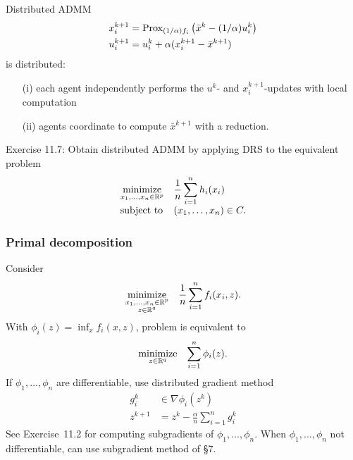 \documentclass[10pt,mathserif]{beamer}
\begin{document}
\begin{frame}
Distributed ADMM
\begin{align*}
x_i^{k+1}&=\mathrm{Prox}_{(1/\alpha)f_i}\left(\bar{x}^{k}-(1/\alpha)u^k_i\right)\\
u_i^{k+1}&=u^k_i+\alpha(x_i^{k+1}-\bar{x}^{k+1})
\end{align*}
 is distributed:
\begin{itemize}
\item[(i)] each agent independently performs the $u^k$- and $x_i^{k+1}$-updates with local computation
\item[(ii)] agents coordinate to compute $\bar{x}^{k+1}$ with a reduction.
\end{itemize}
\pause\medskip

Exercise 11.7: Obtain distributed ADMM by applying DRS to the equivalent problem
\vspace*{-10pt}
\[
\begin{array}{ll}
\underset{x_1,\dots,x_n \in\mathbb{R}^p}{\mbox{minimize}} &\displaystyle{\frac{1}{n}\sum_{i=1}^n h_i(x_i)}\\
\mbox{subject to}& (x_1,\dots,x_n)\in C.
\end{array}
\]
\end{frame}


\begin{frame}[plain]
\frametitle{Primal decomposition}
Consider 
\[
\begin{array}{ll}
\underset{\substack{x_1,\dots,x_n\in\mathbb{R}^p\\z\in \mathbb{R}^q}}{\mbox{minimize}} &\displaystyle{\frac{1}{n}\sum_{i=1}^n f_i(x_i,z)}.
\end{array}
\]
With $ \phi_i(z)=\inf_xf_i(x,z)$, problem is equivalent to
\[
\begin{array}{ll}
\underset{z\in \mathbb{R}^q}{\mbox{minimize}} &\displaystyle{\sum_{i=1}^n \phi_i(z)}.
\end{array}
\]
\pause
If $\phi_1,\dots,\phi_n$ are differentiable, use distributed gradient method
\begin{align*}
g_i^k&\in \nabla \phi_i(z^k)\\
z^{k+1}&=z^k- \frac{\alpha}{n}\sum^n_{i=1}g_i^k
\end{align*}
See Exercise~11.2 for computing subgradients of $\phi_1,\dots,\phi_n$.
When $\phi_1,\dots,\phi_n$  not differentiable, can use subgradient method of \S7.
\end{frame}
\end{document}
